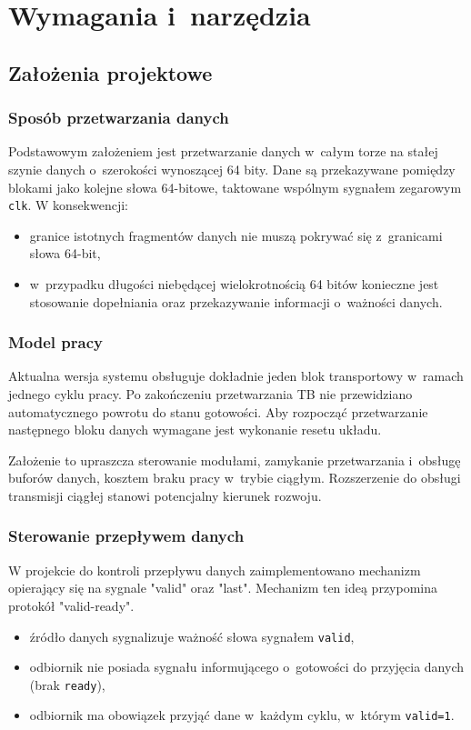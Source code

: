 \chapter{Wymagania i~narzędzia}
\label{ch:wymagania-i-narzedzia}

\section{Założenia projektowe}
\label{sec:zalozenia_projektowe}

\subsection{Sposób przetwarzania danych}
Podstawowym założeniem jest przetwarzanie danych w~całym torze na stałej szynie danych o~szerokości wynoszącej 64 bity. Dane są przekazywane pomiędzy blokami jako kolejne słowa 64-bitowe, taktowane wspólnym sygnałem zegarowym \texttt{clk}. W konsekwencji:
\begin{itemize}
    \item granice istotnych fragmentów danych nie muszą pokrywać się z~granicami słowa 64-bit,
    \item w~przypadku długości niebędącej wielokrotnością 64 bitów konieczne jest stosowanie dopełniania oraz przekazywanie informacji o~ważności danych.
\end{itemize}

\subsection{Model pracy}
Aktualna wersja systemu obsługuje dokładnie jeden blok transportowy w~ramach jednego cyklu pracy. Po zakończeniu przetwarzania TB nie przewidziano automatycznego powrotu do stanu gotowości. Aby rozpocząć przetwarzanie następnego bloku danych wymagane jest wykonanie resetu układu.

Założenie to upraszcza sterowanie modułami, zamykanie przetwarzania i~obsługę buforów danych, kosztem braku pracy w~trybie ciągłym. Rozszerzenie do obsługi transmisji ciągłej stanowi potencjalny kierunek rozwoju.

\subsection{Sterowanie przepływem danych}
W projekcie do kontroli przepływu danych zaimplementowano mechanizm opierający się na sygnale "valid" oraz "last". Mechanizm ten ideą przypomina protokół "valid-ready". 
\begin{itemize}
    \item źródło danych sygnalizuje ważność słowa sygnałem \texttt{valid},
    \item odbiornik nie posiada sygnału informującego o~gotowości do przyjęcia danych (brak \texttt{ready}),
    \item odbiornik ma obowiązek przyjąć dane w~każdym cyklu, w~którym \texttt{valid=1}.
\end{itemize}

